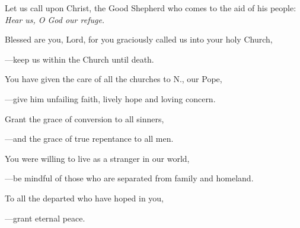 \intercessions\indent

\begin{hangpar}

Let us call upon Christ, the Good Shepherd who comes to the aid of his people:\\
\emph{Hear us, O God our refuge.}

\medskip Blessed are you, Lord, for you graciously called us into your holy Church,

{\color{red}---\thinspace}keep us within the Church until death.

\medskip You have given the care of all the churches to N., our Pope,

{\color{red}---\thinspace}give him unfailing faith, lively hope and loving concern.

\medskip Grant the grace of conversion to all sinners,

{\color{red}---\thinspace}and the grace of true repentance to all men.

\medskip You were willing to live as a stranger in our world,

{\color{red}---\thinspace}be mindful of those who are separated from family and homeland.

\medskip To all the departed who have hoped in you,

{\color{red}---\thinspace}grant eternal peace.

\end{hangpar}

